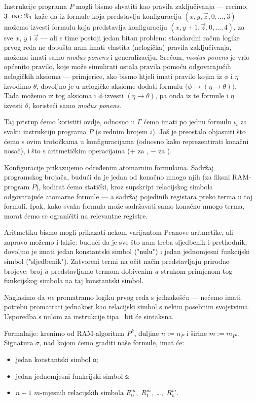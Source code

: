 Instrukcije programa $P$ mogli bismo shvatiti kao pravila zaključivanja --- recimo, $3.\;\textsc{inc}\;\mathcal R_{1}$ kaže da iz formule koja predstavlja konfiguraciju $(x,y,\vec z,0,\dotsc,3)$ možemo izvesti formulu koja predstavlja konfiguraciju $(x,y\!+\!1,\vec z,0,\dotsc,4)$, za sve $x$, $y$ i $\vec z$ --- ali s time postoji jedan bitan problem: standardni račun logike prvog reda ne dopušta nam imati vlastita (nelogička) pravila zaključivanja, možemo imati samo \emph{modus ponens} i generalizaciju. Srećom, \emph{modus ponens} je vrlo općenito pravilo, koje može simulirati ostala pravila pomoću odgovarajućih nelogičkih aksioma --- primjerice, ako bismo htjeli imati pravilo kojim iz $\phi$ i $\eta$ izvodimo $\theta$, dovoljno je u nelogičke aksiome dodati formulu $\bigl(\phi\to(\eta\to\theta)\bigr)$. Tada možemo iz tog aksioma i $\phi$ izvesti $(\eta\to\theta)$, pa onda iz te formule i $\eta$ izvesti $\theta$, koristeći samo \emph{modus ponens}.

Taj pristup ćemo koristiti ovdje, odnosno u $\Gamma$ ćemo imati po jednu formulu $\iota_i$ za svaku instrukciju programa $P$ (s rednim brojem $i$). Još je preostalo objasniti što ćemo s ovim trotočkama u konfiguracijama (odnosno kako reprezentirati konačni nosač), i što s aritmetičkim operacijama ($+$ za \inc, $-$ za \dec).

Konfiguracije prikazujemo određenim atomarnim formulama. Sadržaj programskog brojača, budući da je jedan od konačno mnogo njih (za fiksni RAM-program $P$), kodirat ćemo statički, kroz supskript relacijskog simbola odgovarajuće atomarne formule --- a sadržaj pojedinih registara preko terma u toj formuli. Ipak, kako svaka formula može sadržavati samo konačno mnogo terma, morat ćemo se ograničiti na relevantne registre.

Aritmetiku bismo mogli prikazati nekom
varijantom Peanove aritmetike, ali zapravo možemo i lakše: budući da je sve što nam treba sljedbenik i prethodnik, dovoljno je imati jedan konstantski simbol ("nulu") i jedan jednomjesni funkcijski simbol ("sljedbenik"). Zatvoreni termi na očit način predstavljaju prirodne brojeve: broj $u$ predstavljamo termom dobivenim $u$-strukom primjenom tog funkcijskog simbola na taj konstantski simbol.

Naglasimo da \emph{ne} promatramo logiku prvog reda s jednakošću --- nećemo imati potrebu promatrati jednakost kao relacijski simbol s nekim posebnim svojstvima. Usporedba s nulom za instrukcije tipa \dec\ bit će sintaksna.

Formalnije: krenimo od RAM-algoritma $P^k$, duljine $n:=n_P$ i širine $m:=m_{P^k}$. Signatura $\sigma$, nad kojom ćemo graditi naše formule, imat će:
\begin{itemize}
    \item jedan konstantski simbol $\mathsf o$;
    \item jedan jednomjesni funkcijski simbol $\mathsf s$;
    \item $n+1$ $m$-mjesnih relacijskih simbola $R_0^m$,~$R_1^m$,~\ldots,~$R_n^m$.
\end{itemize}

